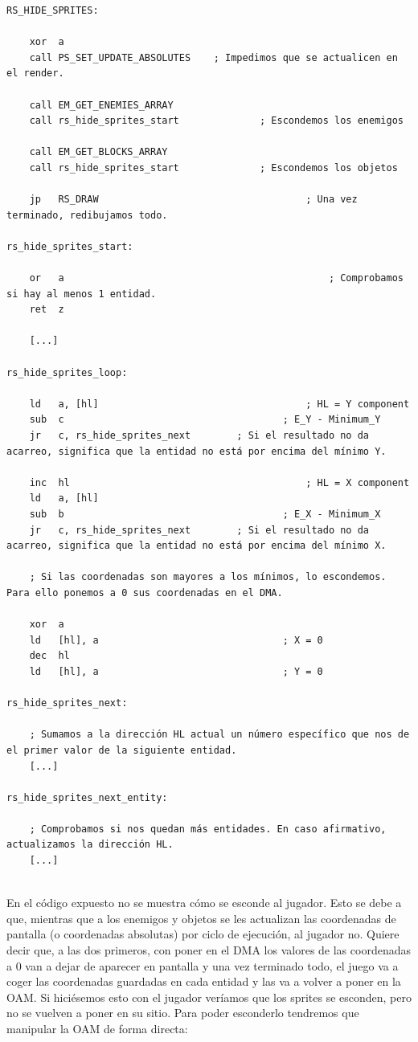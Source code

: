 \begin{lstlisting}[caption={Escondido de Sprites Según su Tile}, label={code:hidesprite}]
RS_HIDE_SPRITES:

	xor  a
	call PS_SET_UPDATE_ABSOLUTES 	; Impedimos que se actualicen en el render.

	call EM_GET_ENEMIES_ARRAY 				
	call rs_hide_sprites_start 				; Escondemos los enemigos

	call EM_GET_BLOCKS_ARRAY
	call rs_hide_sprites_start 				; Escondemos los objetos

	jp 	 RS_DRAW 									; Una vez terminado, redibujamos todo.

rs_hide_sprites_start:

	or 	 a 												; Comprobamos si hay al menos 1 entidad.
	ret  z

	[...]

rs_hide_sprites_loop:

	ld 	 a, [hl] 									; HL = Y component
	sub  c 	 									; E_Y - Minimum_Y
	jr 	 c, rs_hide_sprites_next 	 	; Si el resultado no da acarreo, significa que la entidad no está por encima del mínimo Y.

	inc  hl 										; HL = X component
	ld 	 a, [hl] 									
	sub  b 										; E_X - Minimum_X
	jr 	 c, rs_hide_sprites_next 		; Si el resultado no da acarreo, significa que la entidad no está por encima del mínimo X.

	; Si las coordenadas son mayores a los mínimos, lo escondemos. Para ello ponemos a 0 sus coordenadas en el DMA.

	xor  a
	ld   [hl], a 								; X = 0
	dec  hl
	ld 	 [hl], a 								; Y = 0
	
rs_hide_sprites_next:

	; Sumamos a la dirección HL actual un número específico que nos de el primer valor de la siguiente entidad.
	[...]

rs_hide_sprites_next_entity:
	
	; Comprobamos si nos quedan más entidades. En caso afirmativo, actualizamos la dirección HL.
	[...]
	
\end{lstlisting}

En el código expuesto no se muestra cómo se esconde al jugador. Esto se debe a que, mientras que a los enemigos y objetos se les actualizan las coordenadas de pantalla (o coordenadas absolutas) por ciclo de ejecución, al jugador no. Quiere decir que, a las dos primeros, con poner en el DMA los valores de las coordenadas a 0 van a dejar de aparecer en pantalla y una vez terminado todo, el juego va a coger las coordenadas guardadas en cada entidad y las va a volver a poner en la OAM. Si hiciésemos esto con el jugador veríamos que los sprites se esconden, pero no se vuelven a poner en su sitio. Para poder esconderlo tendremos que manipular la OAM de forma directa:

